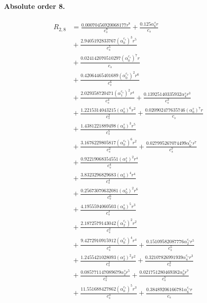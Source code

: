 \documentclass[10pt]{article}
\begin{document}
\paragraph{Absolute order 8.}
\begin{align*}
R_{2,8} &= \frac{0.00070456920068177 r^{8}}{c_{s}^{8}} + \frac{0.125 \alpha_{6}^s r}{c_{s}} \\
&{}  + \frac{2.9405192833767 \left(\alpha_{0}^{c_s}\right)^{3} r^{5}}{c_{s}^{5}} \\
&{}  + \frac{0.024142070510297 \left(\alpha_{0}^{c_s}\right)^{7} r}{c_{s}} \\
&{}  + \frac{0.42064465401689 \left(\alpha_{0}^{c_s}\right)^{2} r^{6}}{c_{s}^{6}} \\
&{}  + \frac{2.029358720471 \left(\alpha_{1}^{c_s}\right)^{2} r^{4}}{c_{s}^{4}} + \frac{0.13925140335932 \alpha_{4}^s r^{3}}{c_{s}^{3}} \\
&{}  + \frac{1.2215314043215 \left(\alpha_{0}^s\right)^{6} r^{2}}{c_{s}^{2}} + \frac{0.020902477635746 \left(\alpha_{0}^s\right)^{7} r}{c_{s}} \\
&{}  + \frac{1.4381221889498 \left(\alpha_{0}^s\right)^{3} r^{5}}{c_{s}^{5}} \\
&{}  + \frac{3.1676229805817 \left(\alpha_{0}^{c_s}\right)^{6} r^{2}}{c_{s}^{2}} + \frac{0.027995267074499 \alpha_{0}^{c_s} r^{7}}{c_{s}^{7}} \\
&{}  + \frac{0.92219068354551 \left(\alpha_{1}^s\right)^{2} r^{4}}{c_{s}^{4}} \\
&{}  + \frac{3.8323296829683 \left(\alpha_{0}^s\right)^{4} r^{4}}{c_{s}^{4}} \\
&{}  + \frac{0.25673070632081 \left(\alpha_{0}^s\right)^{2} r^{6}}{c_{s}^{6}} \\
&{}  + \frac{4.1955594060503 \left(\alpha_{0}^s\right)^{5} r^{3}}{c_{s}^{3}} \\
&{}  + \frac{2.1872579143042 \left(\alpha_{2}^{c_s}\right)^{2} r^{2}}{c_{s}^{2}} \\
&{}  + \frac{9.4272910915912 \left(\alpha_{0}^{c_s}\right)^{4} r^{4}}{c_{s}^{4}} + \frac{0.15109582087776 \alpha_{2}^{c_s} r^{5}}{c_{s}^{5}} \\
&{}  + \frac{1.2455421028093 \left(\alpha_{2}^s\right)^{2} r^{2}}{c_{s}^{2}} + \frac{0.32107826991939 \alpha_{4}^{c_s} r^{3}}{c_{s}^{3}} \\
&{}  + \frac{0.085771147089679 \alpha_{2}^s r^{5}}{c_{s}^{5}} + \frac{0.021751280469382 \alpha_{0}^s r^{7}}{c_{s}^{7}} \\
&{}  + \frac{11.551688427862 \left(\alpha_{0}^{c_s}\right)^{5} r^{3}}{c_{s}^{3}} + \frac{0.38489206166781 \alpha_{6}^{c_s} r}{c_{s}} \\

\end{align*}
\end{document}
